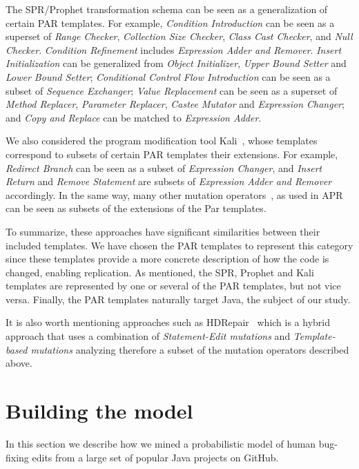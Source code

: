 \documentclass[conference]{IEEEtran}
\begin{document}
The SPR/Prophet transformation schema can be seen as a generalization of certain PAR 
templates. For example, \emph{Condition Introduction} can be seen as a superset of 
\emph{Range Checker}, \emph{Collection Size 
Checker}, \emph{Class Cast Checker}, and \emph{Null Checker}. \emph{Condition Refinement} includes \emph{Expression Adder and Remover}. \emph{Insert Initialization} can be 
generalized from \emph{Object Initializer}, \emph{Upper Bound Setter} and \emph{Lower Bound Setter}; \emph{Conditional Control Flow Introduction} can be 
seen as a subset of \emph{Sequence Exchanger};
\emph{Value Replacement} can be seen as a superset of \emph{Method 
Replacer}, \emph{Parameter Replacer}, \emph{Castee Mutator} and \emph{Expression Changer}; and \emph{Copy 
and Replace} can be matched to \emph{Expression Adder}. 

We also considered the program modification tool Kali~\cite{Qi15}, whose
templates correspond to subsets of certain PAR templates their extensions. 
For example, \emph{Redirect Branch} can be seen as
a subset of \emph{Expression Changer}, and \emph{Insert Return} and \emph{Remove Statement} are
subsets of \emph{Expression Adder and Remover} accordingly. In the same way,
many other mutation operators~\cite{Offutt96,Offutt06}, as used in
APR~\cite{debroy10,xuan16} can be seen as subsets of the extensions of the 
Par templates.

To summarize, these approaches have significant similarities between their
included templates.  We have chosen the PAR templates to represent this category 
since these templates provide a more concrete description of how the code is 
changed, enabling replication. As mentioned, 
the SPR, Prophet and Kali templates are represented by one or several of the PAR
templates, but not vice versa.  Finally, the PAR templates naturally target
Java, the subject of our study. 

It is also worth mentioning approaches such as HDRepair~\cite{xuan16} which is a hybrid approach that uses a combination of \emph{Statement-Edit mutations} and \emph{Template-based mutations} analyzing therefore a subset of the mutation operators described above.

\section{Building the model} \label{buildingTheModel}

In this section we describe how we mined a probabilistic
model of human bug-fixing edits from a large set of popular Java projects on GitHub. 
\end{document}
